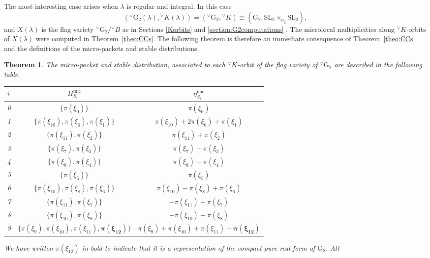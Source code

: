 \documentclass[a4paper, 11pt]{article}
\newtheorem{theo}{Theorem}[section]
\begin{document}
The most interesting case arises when $\lambda$ is
regular and integral. In this case 
$$\left({}^{\vee}\mathrm{G}_{2}(\lambda),{}^{\vee}K(\lambda)\right) =
({^\vee}\mathrm{G}_{2} , {^\vee}K) \cong
 {}(\mathrm{G}_{2},\mathrm{SL}_2\times_{\upmu_2}\mathrm{SL}_2),$$  
and $X(\lambda)$ is the flag variety ${}^{\vee}\mathrm{G}_{2}/
{^\vee}B$ as in Sections \ref{Korbits} and \ref{section:G2computations} .
The microlocal multiplicities along ${}^{\vee}K$-orbits of
$X(\lambda)$ were computed in Theorem~\ref{theo:CCs}. The following
theorem is therefore an immediate consequence of Theorem~\ref{theo:CCs} and
the definitions of the micro-packets and stable distributions.  
\begin{theo}\label{theo:Micropackets}
 The micro-packet and stable distribution, associated to each
 ${}^{\vee}K$-orbit of the flag variety of ${}^{\vee}\mathrm{G}_{2}$
 are described in the following table. 
\begin{center}
\begin{tabular}{ | l | c | c | }
\hline
 $i$ & $\Pi_{S_i}^{\mathrm{mic}}$ & $\eta_{S_i}^{\mathrm{mic}}$
\\ \hline \hline		
   0 & $\{\pi(\xi_0)\}$ & $\pi(\xi_0)$\\	\hline
   1 & $\{\pi(\xi_{10}),\pi(\xi_6),\pi(\xi_1)\}$ & $\pi(\xi_{10})+2\pi(\xi_6)+\pi(\xi_1)$ \\ \hline
   2 & $\{\pi(\xi_{11}),\pi(\xi_2)\}$ & $\pi(\xi_{11})+\pi(\xi_2)$ \\ \hline
   3 & $ \{\pi(\xi_7),\pi(\xi_3)\}$  & $ \pi(\xi_7)+\pi(\xi_3)$ \\ \hline
   4 & $\{\pi(\xi_8),\pi(\xi_4)\}$ & $\pi(\xi_8)+\pi(\xi_4)$\\ \hline
   5 & $\{\pi(\xi_5)\}$ & $\pi(\xi_5)$\\ \hline
   6 & $\{\pi(\xi_{10}),\pi({\xi_8}),\pi(\xi_6)\}$ & $\pi(\xi_{10})-\pi({\xi_8})+\pi(\xi_6)$\\ \hline
   7 & $ \{\pi(\xi_{11}),\pi(\xi_7)\}$ & $ -\pi(\xi_{11})+\pi(\xi_7)$\\ \hline
   8 & $\{\pi(\xi_{10}),\pi(\xi_8)\}$ & $-\pi(\xi_{10})+\pi(\xi_8)$\\ \hline
   9 & $ \{\pi(\xi_9),\pi(\xi_{10}),\pi(\xi_{11}),
\boldsymbol{\pi(\xi_{12})}\}$ & $ \pi(\xi_9)+\pi(\xi_{10})+\pi(\xi_{11})-
\boldsymbol{
\pi(\xi_{12})}$\\ 
  \hline  
 \end{tabular}
\end{center}
We have written $\pi(\xi_{12})$ in bold to indicate that it is a
representation of the compact pure real form of $\mathrm{G}_2$. All

\end{theo}
\end{document}
